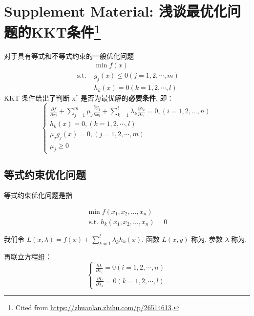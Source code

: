 \section[Supplement Material: 浅谈最优化问题的KKT条件]{Supplement Material: 浅谈最优化问题的KKT条件\footnote{Cited from \url{https://zhuanlan.zhihu.com/p/26514613}.}}


\begin{theorem}[KKT条件]
    对于具有等式和不等式约束的一般优化问题
$$
\begin{aligned}
&\min f({x}) \\
\text { s.t. }& g_{j}({x}) \leq 0(j=1,2, \cdots, m) \\
&h_{k}({x})=0(k=1,2, \cdots, l)
\end{aligned}
$$
KKT 条件给出了判断 $ \mathrm{x}^{*} $ 是否为最优解的\textbf{必要条件}, 即：
$$
\left\{\begin{array}{l}
\frac{\partial f}{\partial x_{i}}+\sum_{j=1}^{m} \mu_{j} \frac{\partial g_{j}}{\partial x_{i}}+\sum_{k=1}^{l} \lambda_{k} \frac{\partial h_{k}}{\partial x_{i}}=0,(i=1,2, \ldots, n) \\
h_{k}({x})=0,(k=1,2, \cdots, l) \\
\mu_{j} g_{j}({x})=0,(j=1,2, \cdots, m) \\
\mu_{j} \geq 0
\end{array}\right.
$$
\end{theorem}


\subsection{等式约束优化问题}

等式约束优化问题是指

\begin{problem}[等式约束优化问题]
    $$
\begin{array}{l}
\min f\left(x_{1}, x_{2}, \ldots, x_{n}\right) \\
\text { s.t. } h_{k}\left(x_{1}, x_{2}, \ldots, x_{n}\right)=0
\end{array}
$$
\end{problem}


我们令 $ L({x}, \lambda)=f({x})+\sum_{k=1}^{l} \lambda_{k} h_{k}({x}) $, 函数 $ L(x, y) $ 称为, 参数 $ \lambda $ 称为.

再联立方程组： 
$$ \left\{\begin{array}{l}\frac{\partial L}{\partial x_{i}}=0(i=1,2, \cdots, n) \\ \frac{\partial L}{\partial \lambda_{k}}=0(k=1,2, \cdots, l)\end{array}\right. $$

